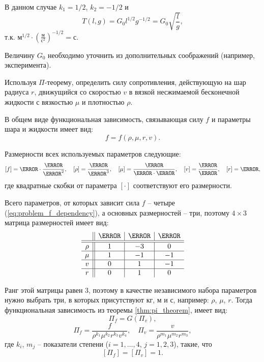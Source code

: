 \documentclass[a4paper, 14pt]{extarticle}
\begin{document}
В данном случае $k_1 = 1/2$, $k_2 = -1/2$ и 
\[
T(l,g) = G_0 l^{1/2} g^{-1/2}= G_0  \sqrt{\frac{l}{g}},
\]
т.к. $\text{м}^{1/2} \cdot \left(\displaystyle\frac{\text{м}}{\text{с}^2}\right)^{-1/2} = \text{с}$.

Величину $G_0$ необходимо уточнить из дополнительных соображений (например, эксперимента).

\begin{problem}
	Используя  $\Pi$-теорему, определить силу сопротивления, действующую на шар радиуса $r$, движущийся со скоростью $v$ в вязкой  несжимаемой бесконечной жидкости с вязкостью $\mu$ и плотностью $\rho$. 
\end{problem}

В общем виде функциональная зависимость, связывающая силу $f$ и параметры шара и жидкости имеет вид:
\begin{equation}
	\label{eq:problem_f_dependency}
	f = f(\rho, \mu, r, v).
\end{equation}

Размерности \alert{всех} используемых параметров следующие:
\[
[f] = \kg \cdot \frac{\m}{\s^2},\quad
[\rho] = \frac{\kg}{\m^3},\quad
[\mu] = \frac{\kg}{\m \cdot \s},\quad
[v]  = \frac{\m}{\s},\quad
[r] = \m,
\]
где квадратные скобки от параметра $[\cdot]$ соответствуют его размерности.

Всего параметров, от которых зависит сила $f$ -- четыре (\ref{eq:problem_f_dependency}), а основных размерностей -- три, поэтому $4 \times 3$ матрица размерностей имеет вид:
\[
\begin{array}{c||c|c|c}
		& \kg & \m &  \s \\
	\hline
	\hline
	\rho & 1 & -3 & 0 \\
	\hline
	\mu & 1 & -1 & -1 \\
	\hline
	v & 0 & 1 & -1 \\
	\hline
	r & 0 & 1 & 0 \\
\end{array}
\]

Ранг этой матрицы равен $3$, поэтому в качестве независимого набора параметров нужно выбрать три, в которых присутствуют кг, м и с, например: $\rho$, $\mu$, $r$. Тогда функциональная зависимость из теоремы \ref{thm:pi_theorem}, имеет вид:
\[
\Pi_f =  G(\Pi_v),
\]
\[
\Pi_f = \frac{f}{\rho^{k_1} \mu^{k_2} r^{k_3} v^{k_4}},\quad
\Pi_v = \frac{v}{\rho^{m_1} \mu^{m_2} r^{m_3}},
\]
где $k_i$, $m_j$ -- показатели степени ($i=1,\ldots,4$, $j=1,2,3$), такие, что
\[
[\Pi_f] = [\Pi_v] = 1.
\]
\end{document}
